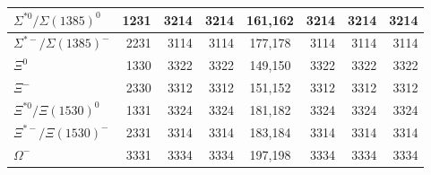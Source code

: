 \begin{tabular}{|l@{\tstrut}|r|r|r|c|r|r|r|}
$\Sigma^{*0}/\Sigma(1385)^0$ &  1231 & 3214 & 3214 & 161,162 &  3214 & 3214 & 3214 \\ \hline
$\Sigma^{*-}/\Sigma(1385)^-$ &  2231 & 3114 & 3114 & 177,178 &  3114 & 3114 & 3114 \\ \hline
$\Xi^0$                      &  1330 & 3322 & 3322 & 149,150 &  3322 & 3322 & 3322 \\ \hline
$\Xi^-$                      &  2330 & 3312 & 3312 & 151,152 &  3312 & 3312 & 3312 \\ \hline
$\Xi^{*0}/\Xi(1530)^0$       &  1331 & 3324 & 3324 & 181,182 &  3324 & 3324 & 3324 \\ \hline
$\Xi^{*-}/\Xi(1530)^-$       &  2331 & 3314 & 3314 & 183,184 &  3314 & 3314 & 3314 \\ \hline
$\Omega^-$                   &  3331 & 3334 & 3334 & 197,198 &  3334 & 3334 & 3334 \\ \hline
\end{tabular}

